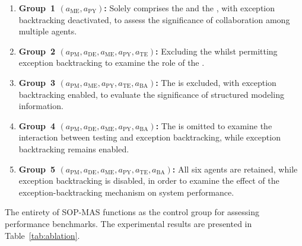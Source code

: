 \documentclass[preprint,12pt]{elsarticle}
\begin{document}
\begin{enumerate}[label=\arabic*)]
 \item \textbf{Group~1 $(a_\text{ME}, a_\text{PY})$:} Solely comprises the  and the , with exception backtracking deactivated, to assess the significance of collaboration among multiple agents.

 \item \textbf{Group~2 $(a_\text{PM}, a_\text{DE}, a_\text{ME}, a_\text{PY}, a_\text{TE})$:} Excluding the  whilst permitting exception backtracking to examine the role of the .

 \item \textbf{Group~3 $(a_\text{PM}, a_\text{ME}, a_\text{PY}, a_\text{TE}, a_\text{BA})$:} The  is excluded, with exception backtracking enabled, to evaluate the significance of structured modeling information.

 \item \textbf{Group~4 $(a_\text{PM}, a_\text{DE}, a_\text{ME}, a_\text{PY}, a_\text{BA})$:} The  is omitted to examine the interaction between testing and exception backtracking, while exception backtracking remains enabled.

 \item \textbf{Group~5 $(a_\text{PM}, a_\text{DE}, a_\text{ME}, a_\text{PY}, a_\text{TE}, a_\text{BA})$:} All six agents are retained, while exception backtracking is disabled, in order to examine the effect of the exception-backtracking mechanism on system performance.
\end{enumerate}
The entirety of SOP-MAS functions as the control group for assessing performance benchmarks. The experimental results are presented in Table~\ref{tab:ablation}.
\end{document}
